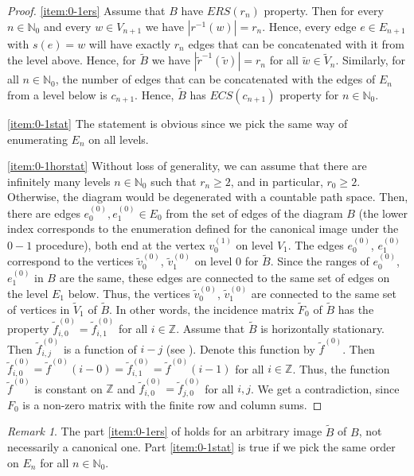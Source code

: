 \documentclass[11pt,reqno]{amsart}
\theoremstyle{definition}
\theoremstyle{remark}
\newtheorem{remark}[definition]{Remark}
\theoremstyle{plain}
\def\tl{\widetilde}
\newcommand{\N}{\mathbb N}
\newcommand{\Z}{\mathbb Z}
\numberwithin{equation}{section}
\begin{document}
\begin{proof}
    \ref{item:0-1ers} Assume that $B$ have $ERS(r_n)$ property. Then for every $n \in \N_0$ and every $w \in V_{n+1}$ we have $|r^{-1}(w)| = r_n$. Hence, every edge $e \in E_{n+1}$ with $s(e) = w$ will have exactly $r_n$ edges that can be concatenated with it from the level above. Hence, for $\tl B$ we have $|{\tl r}^{-1}(\tl v)| = r_n$ for all $\tl w \in \tl V_n$. Similarly, for all $n \in \N_0$, the number of edges that can be concatenated with the edges of $E_n$ from a level below is $c_{n+1}$. Hence, $\tl B$ has $ECS(c_{n+1})$ property for $n \in \N_0$.

    \ref{item:0-1stat} The statement is obvious since we pick the same way of enumerating $E_n$ on all levels.

    \ref{item:0-1horstat} Without loss of generality, we can assume that there are infinitely many levels $n \in \N_0$ such that $r_n \geq 2$, and in particular, $r_0 \geq 2$. Otherwise, the diagram would be degenerated with a countable path space. Then, there are edges $e_0^{(0)}, e_1^{(0)} \in E_0$ from the set of edges of the diagram $B$ (the lower index corresponds to the enumeration defined for the canonical image under the $0-1$ procedure), both end at the vertex $v_0^{(1)}$ on level $V_1$. The edges $e_0^{(0)}$, $e_1^{(0)}$ correspond to the vertices $\tl v_0^{(0)}$, $\tl v_1^{(0)}$ on level $0$ for $\tl B$. Since the ranges of $e_0^{(0)}$, $e_1^{(0)}$ in $B$ are the same, these edges are connected to the same set of edges on the level $E_1$ below. Thus, the vertices $\tl v_0^{(0)}$, $\tl v_1^{(0)}$ are connected to the same set of vertices in $\tl V_1$ of $\tl B$. In other words, the incidence matrix $\tl F_0$ of $\tl B$ has the property $\tl f^{(0)}_{i,0} = \tl f^{(0)}_{i,1}$ for all $i \in \Z$. Assume that $\tl B$ is horizontally stationary. Then $\tl f^{(0)}_{i,j}$ is a function of $i - j$ (see \cite[Proposition 3.2]{BezuglyiJorgensenKarpelKwiatkowski2025}). Denote this function by $\tl f^{(0)}$. Then $\tl f^{(0)}_{i,0} = \tl f^{(0)}(i - 0) = \tl f^{(0)}_{i,1} = \tl f^{(0)}(i-1)$ for all $i \in \Z$. Thus, the function $\tl f^{(0)}$ is constant on $\Z$ and $\tl f^{(0)}_{i,0} = \tl f^{(0)}_{j,0}$ for all $i, j$. We get a contradiction, since $F_0$ is a non-zero matrix with the finite row and column sums.
\end{proof}

\begin{remark}
    The part \ref{item:0-1ers} of  holds for an arbitrary image $\tl B$ of $B$, not necessarily a canonical one. Part \ref{item:0-1stat} is true if we pick the same order on $E_n$ for all $n \in \N_0$.
\end{remark}
\end{document}
